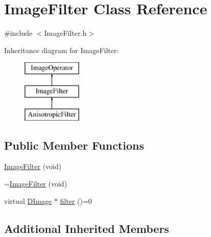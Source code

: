 \hypertarget{class_image_filter}{\section{Image\+Filter Class Reference}
\label{class_image_filter}
}


{\ttfamily \#include $<$Image\+Filter.\+h$>$}

Inheritance diagram for Image\+Filter\+:\begin{figure}[H]
\begin{center}
\leavevmode
\includegraphics[height=3.000000cm]{class_image_filter}
\end{center}
\end{figure}
\subsection*{Public Member Functions}
\begin{DoxyCompactItemize}
\item 
\hyperlink{class_image_filter_a86dae480d07ddd441dc40c3ec89e5d3e}{Image\+Filter} (void)
\item 
\hyperlink{class_image_filter_a8d04f3e5a04c9b93cdbb004519161936}{$\sim$\+Image\+Filter} (void)
\item 
virtual \hyperlink{class_d_image}{D\+Image} $\ast$ \hyperlink{class_image_filter_afb06f41ef9470e2e2673eb3481c1f86a}{filter} ()=0
\end{DoxyCompactItemize}
\subsection*{Additional Inherited Members}


